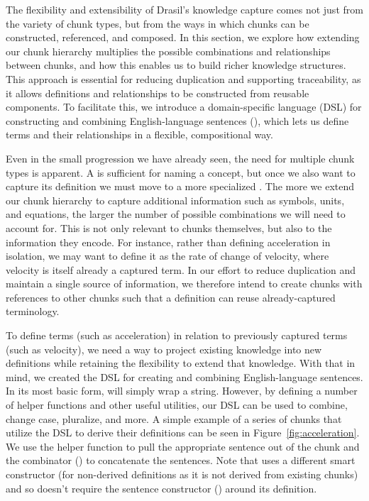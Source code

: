 The flexibility and extensibility of Drasil's knowledge capture comes not just 
from the variety of chunk types, but from the ways in which chunks can be 
constructed, referenced, and composed. In this section, we explore how 
extending our chunk hierarchy multiplies the possible combinations and 
relationships between chunks, and how this enables us to build richer knowledge 
structures. This approach is essential for reducing duplication and supporting 
traceability, as it allows definitions and relationships to be constructed from 
reusable components. To facilitate this, we introduce a domain-specific
language (DSL) for constructing and combining English-language sentences
(), which lets us define terms and their relationships in a
flexible, compositional way.

Even in the small progression we have already seen, the need for multiple 
chunk types is apparent. A  is sufficient for naming a 
concept, but once we also want to capture its definition we must move to a 
more specialized . The more we extend our chunk 
hierarchy to capture additional information such as symbols, units, and 
equations, the larger the number of possible combinations we will need to 
account for. This is not only relevant to chunks themselves, but 
also to the information they encode. For instance, rather than defining 
acceleration in isolation, we may want to define it as the rate of change of 
velocity, where velocity is itself already a captured term. In our effort to 
reduce duplication and maintain a single source of information, we therefore 
intend to create chunks with references to other chunks such that a definition 
can reuse already-captured terminology.

To define terms (such as acceleration) in relation to previously captured terms
(such as velocity), we need a way to project existing knowledge into new
definitions while retaining the flexibility to extend that knowledge. With that
in mind, we created the  DSL for creating and combining 
English-language sentences. In its most basic
form,  will simply wrap a string. However, by defining a number 
of helper functions and other useful utilities, our  DSL can be 
used to combine, change case, pluralize, and more. A simple example of a series 
of chunks that utilize the  DSL to derive their definitions can 
be seen in Figure~\ref{fig:acceleration}. We use the  helper 
function to pull the appropriate sentence out of the  chunk and 
the combinator (\codeH{+:+}) to concatenate the sentences. Note that 
 uses a different smart constructor (for non-derived 
definitions as it is not derived from existing chunks) and so doesn't require 
the sentence constructor () around its definition.

